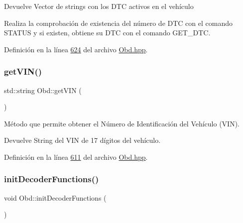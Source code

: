 \begin{DoxyReturn}{Devuelve}
Vector de strings con los D\+TC activos en el vehículo
\end{DoxyReturn}
Realiza la comprobación de existencia del número de D\+TC con el comando S\+T\+A\+T\+US y si existen, obtiene su D\+TC con el comando G\+E\+T\+\_\+\+D\+TC. 

Definición en la línea \hyperlink{Obd_8hpp_source_l00624}{624} del archivo \hyperlink{Obd_8hpp_source}{Obd.\+hpp}.

\mbox{\label{classObd_ad88a0f25a7e3961726737915668ee13d}} 
\subsubsection{\texorpdfstring{get\+V\+I\+N()}{getVIN()}}
{\footnotesize\ttfamily std\+::string Obd\+::get\+V\+IN (\begin{DoxyParamCaption}{ }\end{DoxyParamCaption})\hspace{0.3cm}{\ttfamily [inline]}}



Método que permite obtener el Número de Identificación del Vehículo (V\+IN). 

\begin{DoxyReturn}{Devuelve}
String del V\+IN de 17 dígitos del vehículo. 
\end{DoxyReturn}


Definición en la línea \hyperlink{Obd_8hpp_source_l00611}{611} del archivo \hyperlink{Obd_8hpp_source}{Obd.\+hpp}.

\mbox{\label{classObd_a560631b2e3af0a72c063f915a11e0466}} 
\subsubsection{\texorpdfstring{init\+Decoder\+Functions()}{initDecoderFunctions()}}
{\footnotesize\ttfamily void Obd\+::init\+Decoder\+Functions (\begin{DoxyParamCaption}{ }\end{DoxyParamCaption})\hspace{0.3cm}{\ttfamily [inline]}}



